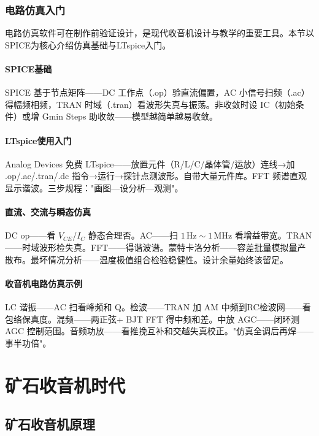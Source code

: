 \documentclass[12pt,UTF8]{ctexbook}
\begin{document}
\section{电路仿真入门}
\label{sec:circuit_simulation}

电路仿真软件可在制作前验证设计，是现代收音机设计与教学的重要工具。本节以SPICE为核心介绍仿真基础与LTspice入门。

\subsection{SPICE基础}
SPICE 基于节点矩阵——DC 工作点（.op）验直流偏置，AC 小信号扫频（.ac）得幅频相频，TRAN 时域（.tran）看波形失真与振荡。非收敛时设 IC（初始条件）或增 Gmin Steps 助收敛——模型越简单越易收敛。

\subsection{LTspice使用入门}
Analog Devices 免费 LTspice——放置元件（R/L/C/晶体管/运放）连线→加 .op/.ac/.tran/.dc 指令→运行→探针点测波形。自带大量元件库。FFT 频谱直观显示谐波。三步规程："画图—设分析—观测"。

\subsection{直流、交流与瞬态仿真}
DC op——看 $V_{CE}$/$I_C$ 静态合理否。AC——扫 $1\,\mathrm{Hz}\sim1\,\mathrm{MHz}$ 看增益带宽。TRAN——时域波形检失真。FFT——得谐波谱。蒙特卡洛分析——容差批量模拟量产散布。最坏情况分析——温度极值组合检验稳健性。设计余量始终该留足。

\subsection{收音机电路仿真示例}
LC 谐振——AC 扫看峰频和 Q。检波——TRAN 加 AM 中频到RC检波网——看包络保真度。混频——两正弦+ BJT FFT 得中频和差。中放 AGC——闭环测 AGC 控制范围。音频功放——看推挽互补和交越失真校正。"仿真全调后再焊——事半功倍"。

\part{矿石收音机时代}

\chapter{矿石收音机原理}
\label{chap:crystal_radio_principle}
\end{document}
